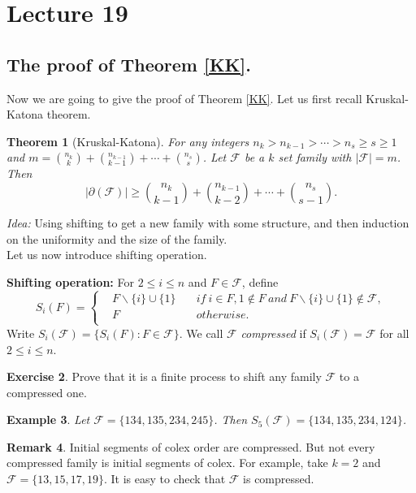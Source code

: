 \documentclass{article}
\newtheorem{theorem}{Theorem}[section]
\newtheorem{example}[theorem]{Example}
\theoremstyle{definition}
\newtheorem{remark}[theorem]{Remark}
\newtheorem{exercise}[theorem]{Exercise}
\begin{document}
\newpage
\section{Lecture 19}
\subsection{The proof of Theorem \ref{KK}.} 
Now we are going to give the proof of Theorem \ref{KK}. Let us first recall Kruskal-Katona theorem. 

\begin{theorem}[Kruskal-Katona]\label{KK1}
For any integers $n_k>n_{k-1}>\cdots>n_s\geq s \geq 1$ and  $m=\binom{n_k}{k}+\binom{n_{k-1}}{k-1}+\cdots+\binom{n_s}{s}$. Let $\mathcal{F}$ be a $k$ set family with  $|\mathcal{F}|=m$. Then 
    $$|\partial(\mathcal{F})|\geq \binom{n_k}{k-1}+\binom{n_{k-1}}{k-2}+\cdots+\binom{n_s}{s-1}.$$
\end{theorem}

\noindent \emph{Idea:} Using shifting to get a new family with some structure, and then induction on the uniformity and the size of the family.\\

Let us now introduce shifting operation. 

\textbf{Shifting operation:} For $2\leq i\leq n$ and $F\in \mathcal{F}$, define
$$S_i(F)=\left\{
    	\begin{aligned}
    	&F\backslash\{i\}\cup \{1\} \quad &if\ i\in F, 1\notin F\ and\ F\backslash \{i\}\cup \{1\}\notin \mathcal{F},\\
    	&F \quad &otherwise.\\
    	\end{aligned}
    	\right.
        $$
Write $S_i(\mathcal{F})=\{S_i(F):F\in \mathcal{F}\}$. We call $\mathcal{F}$ \emph{compressed} if $S_i(\mathcal{F})= \mathcal{F}$ for all $2\leq i\leq n$. 


\begin{exercise}
    Prove that it is a finite process to shift any family $\mathcal{F}$ to a compressed one. 
\end{exercise}


\begin{example}
Let $\mathcal{F}=\{134,135,234,245\}$. Then $S_5(\mathcal{F})=\{134,135,234,124\}$.  
\end{example}

\begin{remark}
    Initial segments of colex order are compressed. But not every compressed family is initial segments of colex. For example, take $k=2$ and $\mathcal{F}=\{13,15,17,19\}$. It is easy to check that  $\mathcal{F}$ is compressed.
 \end{remark}
\end{document}

